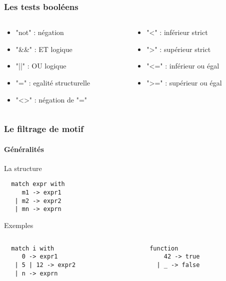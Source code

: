 \begin{frame}[fragile]
    \frametitle{Les tests booléens}
	\begin{columns}
		\begin{column}{5cm}
			\begin{itemize}
				\item "not" : négation
				\item "\&\&" : ET logique
				\item "||" : OU logique
				\item "=" : egalité structurelle
				\item "<>" : négation de "="
			\end{itemize}
		\end{column}
		\begin{column}{5cm}
			\begin{itemize}
				\item "<" : inférieur strict
				\item ">" : supérieur strict
				\item "<=" : inférieur ou égal
				\item ">=" : supérieur ou égal
			\end{itemize}
		\end{column}
	\end{columns}
\end{frame}

\begin{frame}[fragile]
	\frametitle{Le filtrage de motif}
	\framesubtitle{Généralités}
	\begin{block}{La structure}
		\begin{lstlisting}
  match expr with
     m1 -> expr1
   | m2 -> expr2
   | mn -> exprn
		\end{lstlisting}
	\end{block}
	\begin{block}{Exemples}
		\begin{columns}
		\begin{column}{5cm}
		\begin{lstlisting}
  match i with
     0 -> expr1
   | 5 | 12 -> expr2
   | n -> exprn
		\end{lstlisting}
		\end{column}
		\begin{column}{5cm}
		\begin{lstlisting}
  function
      42 -> true
    | _ -> false
		\end{lstlisting} 
		\end{column}
	\end{columns}
	\end{block}
\end{frame}

